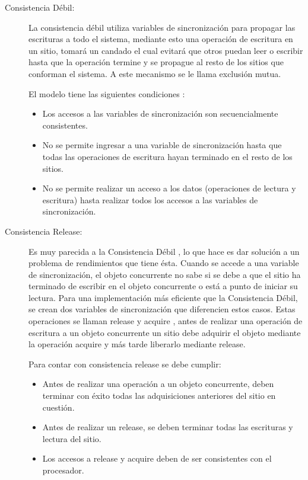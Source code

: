 \begin{description}

\item[Consistencia Débil:]

La consistencia débil utiliza variables de sincronización para propagar las escrituras a todo el sistema, mediante esto una operación de escritura en un sitio, tomará un candado el cual evitará que otros puedan leer o escribir hasta que la operación termine y se propague al resto de los sitios que conforman el sistema. A este mecanismo se le llama exclusión mutua.

El modelo tiene las siguientes condiciones \cite{mosberger:1993}:

\begin{itemize}
\item Los accesos a las variables de sincronización son secuencialmente consistentes.
\item No se permite ingresar a una variable de sincronización hasta que todas las operaciones de escritura hayan terminado en el resto de los sitios.
\item No se permite realizar un acceso a los datos (operaciones de lectura y escritura) hasta realizar todos los accesos a las variables de sincronización. 
\end{itemize}


\item[Consistencia Release:]
Es muy parecida a la Consistencia Débil \cite{mosberger:1993}, lo que hace es dar solución a un problema de rendimientos que tiene ésta. Cuando se accede a una variable de sincronización, el objeto concurrente no sabe si se debe a que el sitio ha terminado de escribir en el objeto concurrente o está a punto de iniciar su lectura. Para una implementación más eficiente que la Consistencia Débil, se crean dos variables de sincronización que diferencien estos casos. Estas operaciones se llaman release y acquire \cite{Gharachorloo1990}, antes de realizar una operación de escritura a un objeto concurrente un sitio debe adquirir el objeto mediante la operación acquire y más tarde liberarlo mediante release.

Para contar con consistencia release se debe cumplir:

\begin{itemize}
\item Antes de realizar una operación  a un objeto concurrente, deben terminar con éxito todas las adquisiciones anteriores del sitio en cuestión.
\item Antes de realizar un release, se deben terminar todas las escrituras y lectura del sitio.
\item Los accesos a release y acquire deben de ser consistentes con el procesador.
\end{itemize}



\end{description}
